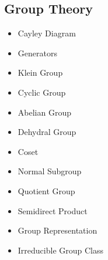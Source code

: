 \documentclass[10pt]{article}
\begin{document}
\subsection{Group Theory}
\begin{itemize}
	\item Cayley Diagram
	\item Generators
	\item Klein Group
	\item Cyclic Group
	\item Abelian Group
	\item Dehydral Group
	\item Coset
	\item Normal Subgroup
	\item Quotient Group
	\item Semidirect Product
	\item Group Representation 
	\item Irreducible Group Class
\end{itemize}
\end{document}
